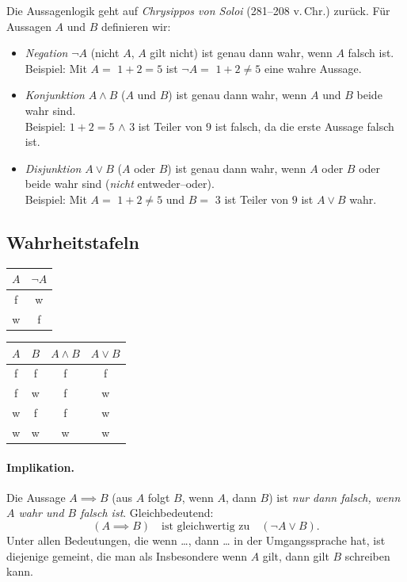 \documentclass[a4paper]{article}
\theoremstyle{kurzskript}
\newcommand{\w}{\textsf{w}}   %
\newcommand{\f}{\textsf{f}}   %
\begin{document}
Die Aussagenlogik geht auf \emph{Chrysippos von Soloi} (281--208 v.\,Chr.) zurück. Für Aussagen $A$ und $B$ definieren wir:
\begin{itemize}
  \item \emph{Negation} $\neg A$ (\glqq nicht $A$\grqq, \glqq $A$ gilt nicht\grqq) ist genau dann wahr, wenn $A$ falsch ist. \\
        Beispiel: Mit $A = $ \glqq$1 + 2 = 5$\grqq{} ist $\neg A = $ \glqq$1 + 2 \neq 5$\grqq{} eine wahre Aussage.
  \item \emph{Konjunktion} $A \land B$ (\glqq $A$ und $B$\grqq) ist genau dann wahr, wenn $A$ und $B$ beide wahr sind. \\
        Beispiel: \glqq$1 + 2 = 5$\grqq{} $\land$ \glqq$3$ ist Teiler von $9$\grqq{} ist falsch, da die erste Aussage falsch ist.
  \item \emph{Disjunktion} $A \lor B$ (\glqq $A$ oder $B$\grqq) ist genau dann wahr, wenn $A$ oder $B$ oder beide wahr sind (\emph{nicht} \glqq entweder--oder\grqq). \\
        Beispiel: Mit $A = $ \glqq$1 + 2 \neq 5$\grqq{} und $B = $ \glqq$3$ ist Teiler von $9$\grqq{} ist $A \lor B$ wahr.
\end{itemize}

\subsection{Wahrheitstafeln}

\begin{center}
\begin{tabular}{c|c}
$A$ & $\neg A$\\\hline
\f & \w\\
\w & \f
\end{tabular}
\qquad\qquad
\begin{tabular}{cc|c|c}
$A$ & $B$ & $A \land B$ & $A \lor B$\\\hline
\f & \f & \f & \f\\
\f & \w & \f & \w\\
\w & \f & \f & \w\\
\w & \w & \w & \w
\end{tabular}
\end{center}

\paragraph{Implikation.}
Die Aussage $A \implies B$ (\glqq aus $A$ folgt $B$\grqq, \glqq wenn $A$, dann $B$\grqq) ist \emph{nur dann falsch, wenn $A$ wahr und $B$ falsch ist}. Gleichbedeutend:
\[
  (A \implies B) \quad\text{ist gleichwertig zu}\quad (\neg A \lor B).
\]
Unter allen Bedeutungen, die \glqq wenn \dots, dann \dots\grqq{} in der Umgangssprache hat, ist diejenige gemeint, die man als \glqq Insbesondere wenn $A$ gilt, dann gilt $B$\grqq{} schreiben kann.
\end{document}
